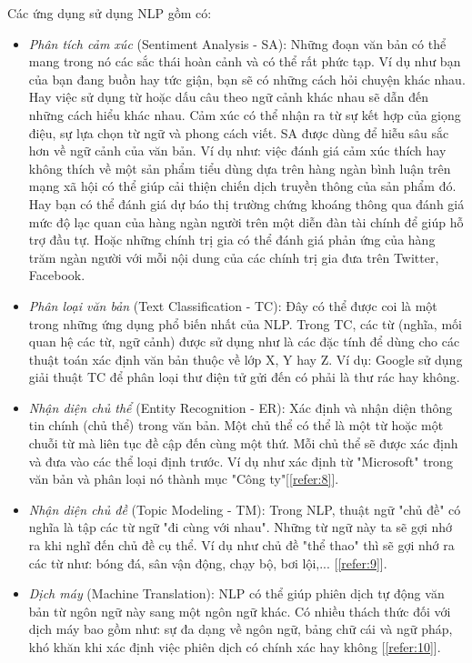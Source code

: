 Các ứng dụng sử dụng NLP gồm có:
\begin{itemize}
    \item \emph{Phân tích cảm xúc} (Sentiment Analysis - SA): Những đoạn văn bản có thể mang trong nó các sắc thái hoàn cảnh và có thể rất phức tạp. Ví dụ như bạn của bạn đang buồn hay tức giận, bạn sẽ có những cách hỏi chuyện khác nhau. Hay việc sử dụng từ hoặc dấu câu theo ngữ cảnh khác nhau sẽ dẫn đến những cách hiểu khác nhau. Cảm xúc có thể nhận ra từ sự kết hợp của giọng điệu, sự lựa chọn từ ngữ và phong cách viết. SA được dùng để hiễu sâu sắc hơn về ngữ cảnh của văn bản. Ví dụ như: việc đánh giá cảm xúc thích hay không thích về một sản phẩm tiểu dùng dựa trên hàng ngàn bình luận trên mạng xã hội có thể giúp cải thiện chiến dịch truyền thông của sản phẩm đó. Hay bạn có thể đánh giá dự báo thị trường chứng khoáng thông qua đánh giá mức độ lạc quan của hàng ngàn người trên một diễn đàn tài chính để giúp hỗ trợ đầu tự. Hoặc những chính trị gia có thể đánh giá phản ứng của hàng trăm ngàn người với mỗi nội dung của các chính trị gia đưa trên Twitter, Facebook.
    \item \emph{Phân loại văn bản} (Text Classification - TC): Đây có thể được coi là một trong những ứng dụng phổ biến nhất của NLP. Trong TC, các từ (nghĩa, mối quan hệ các từ, ngữ cảnh) được sử dụng như là các đặc tính để dùng cho các thuật toán xác định văn bản thuộc về lớp X, Y hay Z. Ví dụ: Google sử dụng giải thuật TC để phân loại thư điện tử gửi đến có phải là thư rác hay không.
    \item \emph{Nhận diện chủ thể} (Entity Recognition - ER): Xác định và nhận diện thông tin chính (chủ thể) trong văn bản. Một chủ thể có thể là một từ hoặc một chuỗi từ mà liên tục đề cập đến cùng một thứ. Mỗi chủ thể sẽ được xác định và đưa vào các thể loại định trước. Ví dụ như xác định từ "Microsoft" trong văn bản và phân loại nó thành mục "Công ty"[\ref{refer:8}].
    \item \emph{Nhận diện chủ đề} (Topic Modeling - TM): Trong NLP, thuật ngữ "chủ đề" có nghĩa là tập các từ ngữ "đi cùng với nhau". Những từ ngữ này ta sẽ gợi nhớ ra khi nghĩ đến chủ đề cụ thể. Ví dụ như chủ đề "thể thao" thì sẽ gợi nhớ ra các từ như: bóng đá, sân vận động, chạy bộ, bơi lội,... [\ref{refer:9}].
    \item \emph{Dịch máy} (Machine Translation): NLP có thể giúp phiên dịch tự động văn bản từ ngôn ngữ này sang một ngôn ngữ khác. Có nhiều thách thức đối với dịch máy bao gồm như: sự đa dạng về ngôn ngữ, bảng chữ cái và ngữ pháp, khó khăn khi xác định việc phiên dịch có chính xác hay không [\ref{refer:10}].

\end{itemize}
